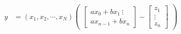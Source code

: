   \begin{align}
    y &= (x_{1},x_{2},\cdots, x_{N})
        \begin{pmatrix}
          \begin{bmatrix}
           ax_{0} + bx_{1} \           
           \vdots \\
           ax_{n-1}+bx_{n}
          \end{bmatrix} -
          \begin{bmatrix}
           z_{1} \\
           \vdots \\
           z_{n}
         \end{bmatrix}
    \end{pmatrix}
  \end{align}